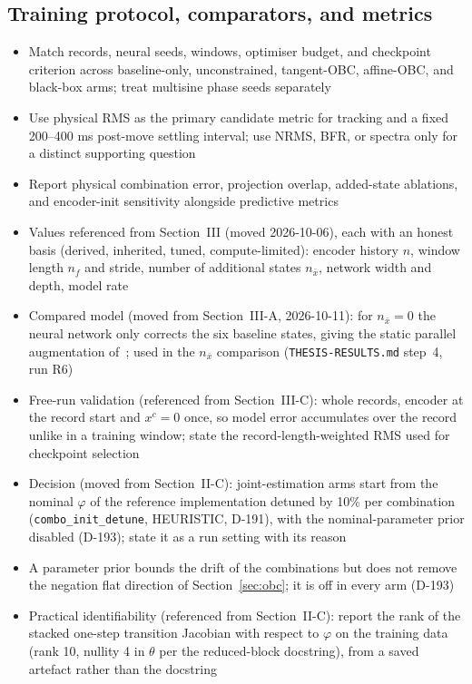 \begin{wip}
\subsection{Training protocol, comparators, and metrics}
\begin{itemize}
\item Match records, neural seeds, windows, optimiser budget, and checkpoint criterion across baseline-only, unconstrained, tangent-OBC, affine-OBC, and black-box arms; treat multisine phase seeds separately
\item Use physical RMS as the primary candidate metric for tracking and a fixed 200--400 ms post-move settling interval; use NRMS, BFR, or spectra only for a distinct supporting question
\item Report physical combination error, projection overlap, added-state ablations, and encoder-init sensitivity alongside predictive metrics
\item Values referenced from Section~III (moved 2026-10-06), each with an honest basis (derived, inherited, tuned, compute-limited): encoder history $n$, window length $n_f$ and stride, number of additional states $n_{\bar x}$, network width and depth, model rate
\item Compared model (moved from Section~III-A, 2026-10-11): for $n_{\bar x}=0$ the neural network only corrects the six baseline states, giving the static parallel augmentation of~\cite[Table~1]{hoekstra2026lfr}; used in the $n_{\bar x}$ comparison (\texttt{THESIS-RESULTS.md} step~4, run R6)
\item Free-run validation (referenced from Section~III-C): whole records, encoder at the record start and $x^c=0$ once, so model error accumulates over the record unlike in a training window; state the record-length-weighted RMS used for checkpoint selection
\item Decision (moved from Section~II-C): joint-estimation arms start from the nominal $\varphi$ of the reference implementation detuned by 10\% per combination (\texttt{combo\_init\_detune}, HEURISTIC, D-191), with the nominal-parameter prior disabled (D-193); state it as a run setting with its reason
\item A parameter prior bounds the drift of the combinations but does not remove the negation flat direction of Section~\ref{sec:obc}; it is off in every arm (D-193)
\item Practical identifiability (referenced from Section~II-C): report the rank of the stacked one-step transition Jacobian with respect to $\varphi$ on the training data (rank 10, nullity 4 in $\theta$ per the reduced-block docstring), from a saved artefact rather than the docstring

\end{itemize}
\end{wip}
